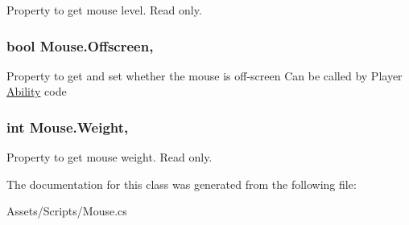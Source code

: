 Property to get mouse level. Read only. 

\subsubsection[{\texorpdfstring{Offscreen}{Offscreen}}]{\setlength{\rightskip}{0pt plus 5cm}bool Mouse.\+Offscreen\hspace{0.3cm}{\ttfamily [get]}, {\ttfamily [set]}}\hypertarget{class_mouse_a4bdbd8793c98c76e0ed8b00717d34325}{}\label{class_mouse_a4bdbd8793c98c76e0ed8b00717d34325}


Property to get and set whether the mouse is off-\/screen Can be called by Player \hyperlink{class_ability}{Ability} code 

\subsubsection[{\texorpdfstring{Weight}{Weight}}]{\setlength{\rightskip}{0pt plus 5cm}int Mouse.\+Weight\hspace{0.3cm}{\ttfamily [get]}, {\ttfamily [set]}}\hypertarget{class_mouse_add4f90aa1a1e81b981a6b2dfdb0c9e24}{}\label{class_mouse_add4f90aa1a1e81b981a6b2dfdb0c9e24}


Property to get mouse weight. Read only. 



The documentation for this class was generated from the following file\+:\begin{DoxyCompactItemize}
\item 
Assets/\+Scripts/Mouse.\+cs\end{DoxyCompactItemize}
